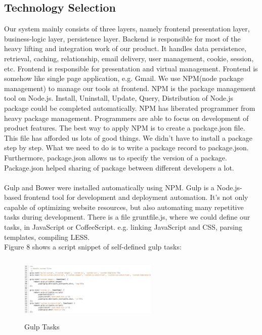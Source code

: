 \documentclass[12pt,oneside,a4paper]{article}
\begin{document}
\subsection{\large Technology Selection}
Our system mainly consists of three layers, namely frontend presentation layer, business-logic layer, persistence layer. Backend is responsible for most of the heavy lifting and integration work of our product. It handles data persistence, retrieval, caching, relationship, email delivery, user management, cookie, session, etc. Frontend is responsible for presentation and virtual management. Frontend is somehow like single page application, e.g. Gmail. We use NPM(node package management) to manage our tools at frontend. NPM is the package management tool on Node.js. Install, Uninstall, Update, Query, Distribution of Node.js package could be completed automatically. NPM has liberated programmer from heavy package management. Programmers are able to focus on development of product features. The best way to apply NPM is to create a package.json file. This file has afforded us lots of good things. We didn't have to install a package step by step. What we need to do is to write a package record to package.json. Furthermore, package.json allows us to specify the version of a package. Package.json helped sharing of package between different developers a lot.\\\\ 
Gulp and Bower were installed automatically using NPM. Gulp is a Node.js-based frontend tool for development and deployment automation. It's not only capable of optimizing website resources, but also automating many repetitive tasks during development. There is a file gruntfile.js, where we could define our tasks, in JavaScript or CoffeeScript. e.g. linking JavaScript and CSS, parsing templates, compiling LESS.\\
Figure 8 shows a script snippet of self-defined gulp tasks:\\
\begin{figure}[htb]
\centering
\includegraphics[width=250px, height=120px]{gulp.png}
\caption{Gulp Tasks}
\label{picture-label8}
\end{figure}
\end{document}
